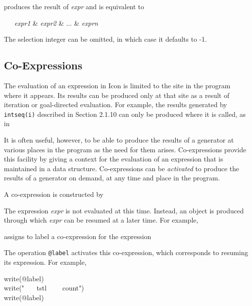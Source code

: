 \noindent
produces the result of \textit{expr} and is equivalent to


\textit{\ \ \ expr1 }\& \textit{expr2 }\& ... \& \textit{exprn}

The selection integer can be omitted, in which case it defaults to -1.

\subsection{Co-Expressions}

\label{Overview-CoExpressions}
The evaluation of an expression in Icon is limited to the site in the
program where it appears. Its results can be produced only at that
site as a result of iteration or goal-directed evaluation. For
example, the results generated by \texttt{intseq(i)} described in
Section 2.1.10 can only be produced where it is called, as in


It is often useful, however, to be able to produce the results of a
generator at various places in the program as the need for them
arises. Co-expressions provide this facility by giving a context for
the evaluation of an expression that is maintained in a data
structure. Co-expressions can be \textit{activated }to produce the
results of a generator on demand, at any time and place in the
program.

A co-expression is constructed by


The expression \textit{expr} is not evaluated at this time. Instead,
an object is produced through which \textit{expr} can be resumed at a
later time. For example,


\noindent assigns to label a co-expression for the expression


\noindent
The operation \texttt{@label} activates this co-expression, which
corresponds to resuming its expression. For example,

\begin{iconcode}
\>write(@label)\\
\>write(" \ \ \ tstl \ \ \ \ count")\\
\>write(@label)
\end{iconcode}

